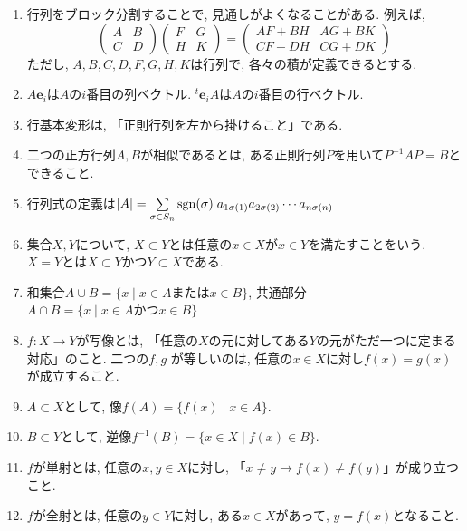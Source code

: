\documentclass[a4j,dvipdfmx]{jsarticle}
\newcommand{\trans}{{}^t}
\theoremstyle{mystyle}
\begin{document}
    \begin{enumerate}
        \item 行列をブロック分割することで, 見通しがよくなることがある. 例えば, 
        \begin{equation*}
            \begin{pmatrix}
                A & B \\ C & D
            \end{pmatrix}
            \begin{pmatrix}
                F & G \\ H & K
            \end{pmatrix} = 
            \begin{pmatrix}
                AF+BH & AG+BK \\ CF+DH & CG+DK
            \end{pmatrix}
        \end{equation*}
        ただし, $A,B,C,D,F,G,H,K$は行列で, 各々の積が定義できるとする.
        \item $A\bm{e}_i$は$A$の$i$番目の列ベクトル. $\trans\bm{e}_i A$は$A$の$i$番目の行ベクトル.
        \item 行基本変形は, 「正則行列を左から掛けること」である.
        \item 二つの正方行列$A,B$が相似であるとは, ある正則行列$P$を用いて$P^{-1}AP=B$とできること.
        \item 行列式の定義は$|A|=\sum\limits_{\sigma\in S_{n}} \mathrm{sgn}(\sigma) \hspace{1mm} a_{1\sigma(1)}a_{2\sigma(2)}\cdots a_{n\sigma(n)}$
        \item 集合$X,Y$について, $X\subset Y$とは任意の$x\in X$が$x\in Y$を満たすことをいう. $X=Y$とは$X\subset Y$かつ$Y\subset X$である.
        \item 和集合$A\cup B = \{x\mid x\in A または x\in B\}$, 共通部分$A\cap B = \{x\mid x\in A かつ x\in B\}$
        \item $f:X\to Y$が写像とは, 「任意の$X$の元に対してある$Y$の元がただ一つに定まる対応」のこと. 二つの$f,g$ が等しいのは, 任意の$x\in X$に対し$f(x)=g(x)$が成立すること.
        \item $A\subset X$として, 像$f(A)=\{f(x)\mid x\in A\}$.
        \item $B\subset Y$として, 逆像$f^{-1}(B)=\{x\in X\mid f(x)\in B\}$.
        \item $f$が単射とは, 任意の$x,y\in X$に対し, 「$x\neq y\rightarrow f(x)\neq f(y)$」が成り立つこと.
        \item $f$が全射とは, 任意の$y\in Y$に対し, ある$x\in X$があって, $y=f(x)$となること.
    \end{enumerate}
\clearpage
\end{document}
